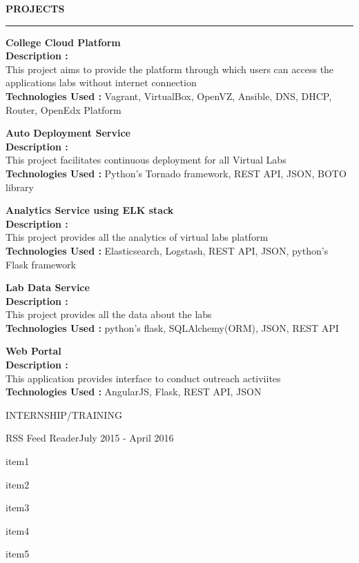 \documentclass{resume} %
\begin{document}

\textbf{PROJECTS}
\sectionlineskip
\hrule
\textbf{College Cloud Platform} \\
\textbf{Description :} \\
This project aims to provide the platform through which users can access the
applications labs without internet connection \\
\textbf{Technologies Used :} Vagrant, VirtualBox, OpenVZ, Ansible, DNS, DHCP,
Router, OpenEdx Platform

\textbf{Auto Deployment Service} \\
\textbf{Description :} \\
This project facilitates continuous deployment for all Virtual Labs \\
\textbf{Technologies Used :} Python's Tornado framework, REST API, JSON, BOTO library

\textbf{Analytics Service using ELK stack} \\
\textbf{Description :} \\
This project provides all the analytics of virtual labs platform \\
\textbf{Technologies Used :} Elasticsearch, Logstash, REST API, JSON, python's Flask framework

\textbf{Lab Data Service} \\
\textbf{Description :} \\
This project provides all the data about the labs \\
\textbf{Technologies Used :} python's flask, SQLAlchemy(ORM), JSON, REST API


\textbf{Web Portal} \\
\textbf{Description :} \\
This application provides interface to conduct outreach activiites \\
\textbf{Technologies Used :} AngularJS, Flask, REST API, JSON



\begin{rSection}{INTERNSHIP/TRAINING}

  \begin{rSubsection}
    {RSS Feed Reader}{July 2015 - April 2016}{}{}
  \item item1
  \item item2
  \item item3
  \item item4
  \item item5
 
  \end{rSubsection} 

\end{rSection} 
\end{document}
